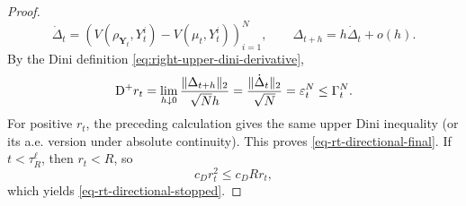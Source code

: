 \begin{proof}
\[
 \dot\Delta_t=
 (V(\rho_{\mathbf Y_t},Y_t^i)-V(\mu_t,Y_t^i))_{i=1}^N,
 \qquad \Delta_{t+h}=h\dot\Delta_t+o(h).
\]
By the Dini definition \eqref{eq:right-upper-dini-derivative},
\[
 \mathrm{D}^+r_t
 =\lim_{h\downarrow0}\frac{\|\Delta_{t+h}\|_2}{\sqrt N h}
 =\frac{\|\dot\Delta_t\|_2}{\sqrt N}
 =\varepsilon_t^N\le\Gamma_t^N.
\]
For positive $r_t$, the preceding calculation gives the same upper Dini
inequality (or its a.e. version under absolute continuity). This proves
\cref{eq-rt-directional-final}. If \(t<\tau_R^\ell\), then \(r_t<R\), so
\begin{equation}
    c_Dr_t^2
    \le
    c_DRr_t,
\end{equation}
which yields \cref{eq-rt-directional-stopped}.
\end{proof}
